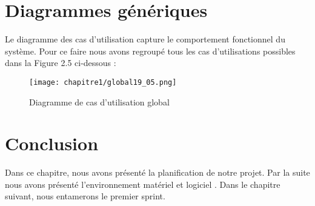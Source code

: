 \section*{Diagrammes génériques}
Le diagramme des cas d'utilisation capture le comportement fonctionnel du système. Pour ce faire nous avons regroupé tous les cas d'utilisations possibles dans la Figure 2.5 ci-dessous :

\begin{figure}[H]
\centering
\texttt{[image: chapitre1/global19\_05.png]}
\vspace{2mm} %
\caption{Diagramme de cas d'utilisation global}
\end{figure}

\section*{Conclusion}
Dans ce chapitre, nous avons présenté la planification de notre projet. Par la suite nous avons présenté l'environnement matériel et logiciel .
\newline
Dans le chapitre suivant, nous entamerons le premier sprint.
